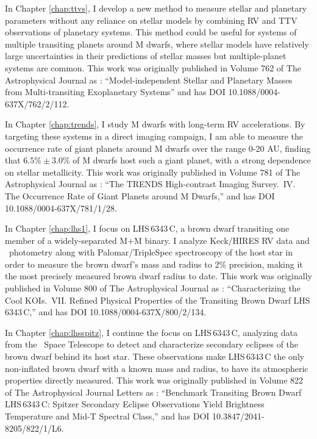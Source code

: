 In Chapter \ref{chap:ttvs}, I develop a new method to measure stellar and planetary 
parameters without any reliance on stellar models by combining RV and TTV observations
of planetary systems.
This method could be useful for systems of multiple transiting planets around M dwarfs,
where stellar models have relatively large uncertainties in their predictions of stellar
masses but multiple-planet systems are common.
This work was originally published in Volume 762 of The Astrophysical Journal as \citet{Montet13}: ``Model-independent Stellar and Planetary Masses from Multi-transiting Exoplanetary Systems'' and has DOI 10.1088/0004-637X/762/2/112.

In Chapter \ref{chap:trends}, I study M dwarfs with long-term RV accelerations.
By targeting these systems in a direct imaging campaign, I am able to measure the
occurrence rate of giant planets around M dwarfs over the range 0-20 AU, finding
that $6.5\% \pm 3.0\%$ of M dwarfs host such a giant planet, with a strong dependence
on stellar metallicity. This work was originally published in Volume 781 of The
Astrophysical Journal as \citet{Montet14}: ``The TRENDS High-contrast Imaging Survey.\ IV. The Occurrence Rate of Giant Planets around M Dwarfs,'' and has DOI 10.1088/0004-637X/781/1/28.

In Chapter \ref{chap:lhs1}, I focus on LHS\,6343\,C, a brown dwarf transiting one member
of a widely-separated M+M binary. I analyze Keck/HIRES RV data and \kep\ photometry
along with Palomar/TripleSpec spectroscopy of the host star 
in order to measure the brown dwarf's mass and radius to 2\% precision, making it the
most precisely measured brown dwarf radius to date. This work was originally published
in Volume 800 of The Astrophysical Journal as \citet{Montet15a}: ``Characterizing the Cool KOIs.\ VII. Refined Physical Properties of the Transiting Brown Dwarf LHS\,6343\,C,''
and has DOI 10.1088/0004-637X/800/2/134.


In Chapter \ref{chap:lhsspitz}, I continue the focus on LHS\,6343\,C,
analyzing data from the \spitz\ Space Telescope to detect and characterize secondary eclipses of the brown dwarf behind its host star.
These observations make LHS\,6343\,C the only non-inflated brown dwarf with a known  mass and radius, to have its atmospheric properties directly measured. 
This work was originally published in Volume 822 of The Astrophysical Journal Letters
as \citet{Montet16a}:
``Benchmark Transiting Brown Dwarf LHS\,6343\,C: Spitzer Secondary Eclipse Observations Yield Brightness Temperature and Mid-T Spectral Class,'' and has DOI
10.3847/2041-8205/822/1/L6.

